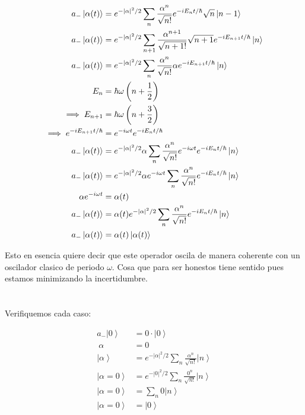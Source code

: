 \documentclass{report}
\begin{document}
\begin{align*}
  a_{-}\left|\alpha(t)\right> &=e^{-\left|\alpha\right|^2/2} \sum_{n} \frac{\alpha^n}{\sqrt{n!}}  e^{-i E_n t/ \hbar}\sqrt{n}\left| n - 1\right> \\
  a_{-}\left|\alpha(t)\right> &=e^{-\left|\alpha\right|^2/2} \sum_{n + 1} \frac{\alpha^{n + 1}}{\sqrt{n + 1!}} \sqrt{n + 1} e^{-i E_{n + 1} t/ \hbar}\left| n\right> \\
  a_{-}\left|\alpha(t)\right> &=e^{-\left|\alpha\right|^2/2} \sum_{n} \frac{\alpha^{n}}{\sqrt{n!}}\alpha e^{-i E_{n + 1} t/ \hbar}\left| n\right> \\
  E_n &= \hbar\omega\left(n + \frac{1}{2}\right)\\
  \implies E_{n + 1} &= \hbar\omega\left(n + \frac{3}{2}\right)\\
  \implies e^{-iE_{n + 1}t/\hbar} &= e^{-i\omega t}e^{-i E_n t/\hbar}\\
  a_{-}\left|\alpha(t)\right> &=e^{-\left|\alpha\right|^2/2} \alpha \sum_{n} \frac{\alpha^{n}}{\sqrt{n!}} e^{-i\omega t}e^{-i E_n t/\hbar} \left| n\right> \\
  a_{-}\left|\alpha(t)\right> &=e^{-\left|\alpha\right|^2/2} \alpha e^{-i\omega t}\sum_{n} \frac{\alpha^{n}}{\sqrt{n!}} e^{-i E_n t/\hbar} \left| n\right> \\
  \alpha e^{-i\omega t} &= \alpha(t)\\
  a_{-}\left|\alpha(t)\right> &=\alpha(t) e^{-\left|\alpha\right|^2/2} \sum_{n} \frac{\alpha^{n}}{\sqrt{n!}} e^{-i E_n t/\hbar} \left| n\right> \\
  a_{-}\left|\alpha(t)\right> &=\alpha(t) \left|\alpha(t)\right>
\end{align*}

Esto en esencia quiere decir que este operador oscila de manera coherente con un oscilador clasico de periodo $\omega$. Cosa que para ser honestos tiene sentido pues estamos minimizando la incertidumbre.

\pagebreak

\section{}

Verifiquemos cada caso:

\begin{align*}
  a_{-}\left| 0 \right> &= 0 \cdot \left| 0 \right>\\\
  \alpha &= 0\\
  \left| \alpha \right> &= e^{-\left|\alpha\right|^2/2} \sum_{n} \frac{\alpha^n}{\sqrt{n!}}  \left| n \right>\\
  \left| \alpha = 0 \right> &= e^{-\left| 0 \right|^2/2} \sum_{n} \frac{0^n}{\sqrt{n!}}  \left| n \right>\\
  \left| \alpha = 0 \right> &= \sum_{n} 0  \left| n \right>\\
  \left| \alpha = 0 \right> &= \left| 0 \right>
\end{align*}
\end{document}
